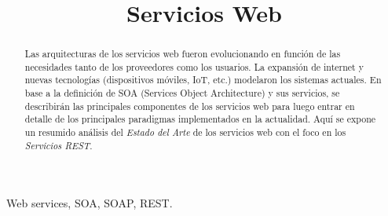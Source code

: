 \documentclass[conference]{IEEEtran}
\begin{document}
%
\title{Servicios Web}

\author{
}



\maketitle


\begin{abstract}
  Las arquitecturas de los servicios web fueron evolucionando en
  función de las necesidades tanto de los proveedores como los
  usuarios. La expansión de internet y nuevas tecnologías (dispositivos
  móviles, IoT, etc.) modelaron los sistemas actuales. En base a la
  definición de SOA (Services Object Architecture) y sus servicios, se
  describirán las principales componentes de los servicios web para
  luego entrar en detalle de los principales paradigmas implementados en
  la actualidad. Aquí se expone un resumido análisis del \emph{Estado
    del Arte} de los servicios web con el foco en los \emph{Servicios
    REST}.
\end{abstract}

\begin{IEEEkeywords}
Web services, SOA, SOAP, REST.
\end{IEEEkeywords}



%
\IEEEpeerreviewmaketitle
\end{document}
